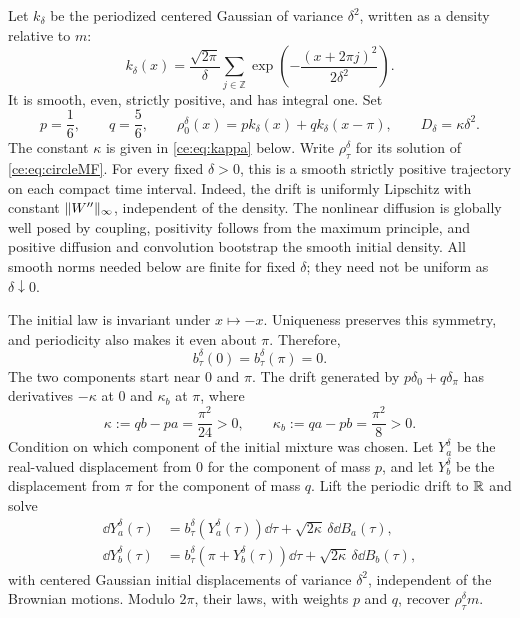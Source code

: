 \documentclass[11pt,reqno]{amsart}
\numberwithin{equation}{section}
\theoremstyle{plain}
\theoremstyle{remark}
\DeclarePairedDelimiter{\norm}{\lVert}{\rVert}
\begin{document}
Let $k_\delta$ be the periodized centered Gaussian of variance $\delta^2$, written as a density relative to $m$:
\begin{equation}\label{ce:eq:bump}
 k_\delta(x)=\frac{\sqrt{2\pi}}{\delta}
 \sum_{j\in\mathbb Z}\exp\!\left(-\frac{(x+2\pi j)^2}{2\delta^2}\right).
\end{equation}
It is smooth, even, strictly positive, and has integral one. Set
\begin{equation}\label{ce:eq:rhoinitial}
 p=\frac16,\qquad q=\frac56,\qquad
 \rho^\delta_0(x)=pk_\delta(x)+qk_\delta(x-\pi),
 \qquad D_\delta=\kappa\delta^2.
\end{equation}
The constant $\kappa$ is given in \eqref{ce:eq:kappa} below. Write $\rho^\delta_\tau$ for its solution of \eqref{ce:eq:circleMF}. For every fixed $\delta>0$, this is a smooth strictly positive trajectory on each compact time interval. Indeed, the drift is uniformly Lipschitz with constant $\norm{W''}_\infty$, independent of the density. The nonlinear diffusion is globally well posed by coupling, positivity follows from the maximum principle, and positive diffusion and convolution bootstrap the smooth initial density. All smooth norms needed below are finite for fixed $\delta$; they need not be uniform as $\delta\downarrow0$.

The initial law is invariant under $x\mapsto-x$. Uniqueness preserves this symmetry, and periodicity also makes it even about $\pi$. Therefore,
\begin{equation}\label{ce:eq:centersfixed}
 b^\delta_\tau(0)=b^\delta_\tau(\pi)=0.
\end{equation}
The two components start near $0$ and $\pi$. The drift generated by $p\delta_0+q\delta_\pi$ has derivatives $-\kappa$ at $0$ and $\kappa_b$ at $\pi$, where
\begin{equation}\label{ce:eq:kappa}
 \kappa:=qb-pa=\frac{\pi^2}{24}>0,
 \qquad \kappa_b:=qa-pb=\frac{\pi^2}{8}>0.
\end{equation}
Condition on which component of the initial mixture was chosen. Let $Y_a^\delta$ be the real-valued displacement from $0$ for the component of mass $p$, and let $Y_b^\delta$ be the displacement from $\pi$ for the component of mass $q$. Lift the periodic drift to $\mathbb R$ and solve
\begin{align}
 \dd Y_a^\delta(\tau)&=b_\tau^\delta(Y_a^\delta(\tau))\dd\tau+\sqrt{2\kappa}\,\delta\dd B_a(\tau),\label{ce:eq:minority-lift}\\
 \dd Y_b^\delta(\tau)&=b_\tau^\delta(\pi+Y_b^\delta(\tau))\dd\tau+\sqrt{2\kappa}\,\delta\dd B_b(\tau),\label{ce:eq:majority-lift}
\end{align}
with centered Gaussian initial displacements of variance $\delta^2$, independent of the Brownian motions. Modulo $2\pi$, their laws, with weights $p$ and $q$, recover $\rho^\delta_\tau m$. 
\end{document}
